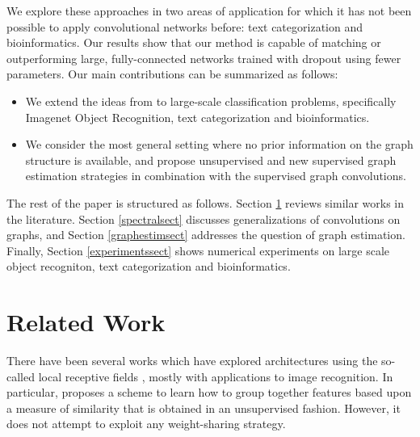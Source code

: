 \documentclass{article} %
\begin{document}
We explore these approaches in two areas of application for which it has not been possible to apply convolutional networks before: text categorization and bioinformatics. Our results show that our method is capable of matching or outperforming large, fully-connected networks trained with dropout using fewer parameters. 
Our main contributions can be summarized as follows:
\begin{itemize}
\item We extend the ideas from \cite{spectralnet2013} to large-scale classification problems, specifically Imagenet Object Recognition, text categorization and bioinformatics.
\item We consider the most general setting where no prior information on the graph structure is available, and propose unsupervised and new supervised graph estimation strategies in combination with the supervised graph convolutions.
\end{itemize}

The rest of the paper is structured as follows. Section \ref{relatedworksect} reviews similar works in the literature. Section \ref{spectralsect} discusses generalizations of convolutions on graphs, and Section \ref{graphestimsect} addresses the question of graph estimation. Finally, Section \ref{experimentssect} shows numerical experiments on large scale object recogniton, text categorization and bioinformatics.

\section{Related Work}
\label{relatedworksect}

There have been several works which have explored architectures using the so-called local receptive fields \cite{karol, coates2011selecting, ngiam2010tiled}, mostly with applications to image recognition. In particular, \cite{coates2011selecting} proposes a scheme to learn how to group together features based upon a measure of similarity that is obtained in an unsupervised fashion. However, it does not attempt to exploit any weight-sharing strategy. 
\end{document}
